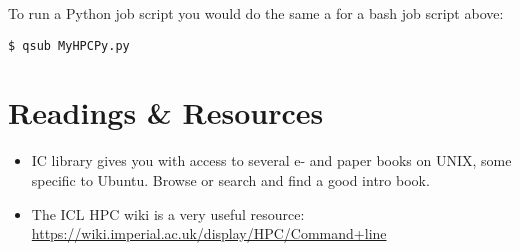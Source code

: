 To run a Python job script you would do the same a for a bash job script above:

\begin{lstlisting}
$ qsub MyHPCPy.py
\end{lstlisting}

\section{Readings \& Resources}
\begin{itemize} \itemsep6pt
    \item IC library gives you with access to several e- and paper books on UNIX, some specific to Ubuntu. Browse or search and find a good intro book.
    \item The ICL HPC wiki is a very useful resource: \url{https://wiki.imperial.ac.uk/display/HPC/Command+line}
\end{itemize}


